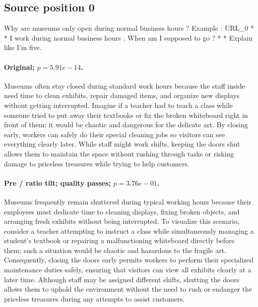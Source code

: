 \subsection*{Source position 0}
Why are museums only open during normal business hours ? Example : URL\_0 * * I work during normal business hours . When am I supposed to go ? * * Explain like I'm five.

\paragraph{Original; $p=5.91e-14$.} Museums often stay closed during standard work hours because the staff inside need time to clean exhibits, repair damaged items, and organize new displays without getting interrupted. Imagine if a teacher had to teach a class while someone tried to put away their textbooks or fix the broken whiteboard right in front of them; it would be chaotic and dangerous for the delicate art. By closing early, workers can safely do their special cleaning jobs so visitors can see everything clearly later. While staff might work shifts, keeping the doors shut allows them to maintain the space without rushing through tasks or risking damage to priceless treasures while trying to help customers.


\paragraph{Pre / ratio tilt; quality passes; $p=3.76e-01$.} Museums frequently remain shuttered during typical working hours because their employees must dedicate time to cleaning displays, fixing broken objects, and arranging fresh exhibits without being interrupted. To visualize this scenario, consider a teacher attempting to instruct a class while simultaneously managing a student's textbook or repairing a malfunctioning whiteboard directly before them; such a situation would be chaotic and hazardous to the fragile art. Consequently, closing the doors early permits workers to perform their specialized maintenance duties safely, ensuring that visitors can view all exhibits clearly at a later time. Although staff may be assigned different shifts, shutting the doors allows them to uphold the environment without the need to rush or endanger the priceless treasures during any attempts to assist customers.

